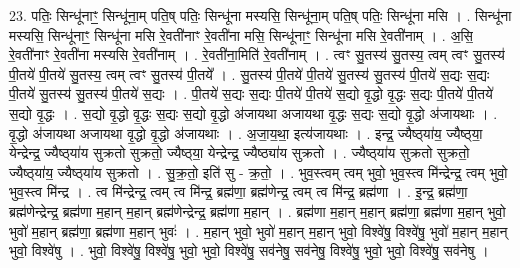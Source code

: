 \documentclass[17pt]{extarticle}
\begin{document}
23. पतिः॒ सिन्धू॑नाꣳ॒॒ सिन्धू॑ना॒म् पति॒ष् पतिः॒ सिन्धू॑ना मस्यसि॒ सिन्धू॑ना॒म् पति॒ष् पतिः॒ सिन्धू॑ना मसि । . सिन्धू॑ना मस्यसि॒ सिन्धू॑नाꣳ॒॒ सिन्धू॑ना मसि रे॒वती॑नाꣳ रे॒वती॑ना मसि॒ सिन्धू॑नाꣳ॒॒ सिन्धू॑ना मसि रे॒वती॑नाम् । . अ॒सि॒ रे॒वती॑नाꣳ रे॒वती॑ना मस्यसि रे॒वती॑नाम् । . रे॒वती॑ना॒मिति॑ रे॒वती॑नाम् । . त्वꣳ सु॒तस्य॑ सु॒तस्य॒ त्वम् त्वꣳ सु॒तस्य॑ पी॒तये॑ पी॒तये॑ सु॒तस्य॒ त्वम् त्वꣳ सु॒तस्य॑ पी॒तये᳚ । . सु॒तस्य॑ पी॒तये॑ पी॒तये॑ सु॒तस्य॑ सु॒तस्य॑ पी॒तये॑ स॒द्यः स॒द्यः पी॒तये॑ सु॒तस्य॑ सु॒तस्य॑ पी॒तये॑ स॒द्यः । . पी॒तये॑ स॒द्यः स॒द्यः पी॒तये॑ पी॒तये॑ स॒द्यो वृ॒द्धो वृ॒द्धः स॒द्यः पी॒तये॑ पी॒तये॑ स॒द्यो वृ॒द्धः । . स॒द्यो वृ॒द्धो वृ॒द्धः स॒द्यः स॒द्यो वृ॒द्धो अ॑जायथा अजायथा वृ॒द्धः स॒द्यः स॒द्यो वृ॒द्धो अ॑जायथाः । . वृ॒द्धो अ॑जायथा अजायथा वृ॒द्धो वृ॒द्धो अ॑जायथाः । . अ॒जा॒य॒था॒ इत्य॑जायथाः । . इन्द्र॒ ज्यैष्ठ्‍या॑य॒ ज्यैष्ठ्‍या॒ येन्द्रेन्द्र॒ ज्यैष्ठ्‍या॑य सुक्रतो सुक्रतो॒ ज्यैष्ठ्‍या॒ येन्द्रेन्द्र॒ ज्यैष्ठ्या॑य सुक्रतो । . ज्यैष्ठ्‍या॑य सुक्रतो सुक्रतो॒ ज्यैष्ठ्‍या॑य॒ ज्यैष्ठ्‍या॑य सुक्रतो । . सु॒क्र॒तो॒ इति॑ सु - क्र॒तो॒ । . भुव॒स्त्वम् त्वम् भुवो॒ भुव॒स्त्व मि॑न्द्रेन्द्र॒ त्वम् भुवो॒ भुव॒स्त्व मि॑न्द्र । . त्व मि॑न्द्रेन्द्र॒ त्वम् त्व मि॑न्द्र॒ ब्रह्म॑णा॒ ब्रह्म॑णेन्द्र॒ त्वम् त्व मि॑न्द्र॒ ब्रह्म॑णा । . इ॒न्द्र॒ ब्रह्म॑णा॒ ब्रह्म॑णेन्द्रेन्द्र॒ ब्रह्म॑णा म॒हान् म॒हान् ब्रह्म॑णेन्द्रेन्द्र॒ ब्रह्म॑णा म॒हान् । . ब्रह्म॑णा म॒हान् म॒हान् ब्रह्म॑णा॒ ब्रह्म॑णा म॒हान् भुवो॒ भुवो॑ म॒हान् ब्रह्म॑णा॒ ब्रह्म॑णा म॒हान् भुवः॑ । . म॒हान् भुवो॒ भुवो॑ म॒हान् म॒हान् भुवो॒ विश्वे॑षु॒ विश्वे॑षु॒ भुवो॑ म॒हान् म॒हान् भुवो॒ विश्वे॑षु । . भुवो॒ विश्वे॑षु॒ विश्वे॑षु॒ भुवो॒ भुवो॒ विश्वे॑षु॒ सव॑नेषु॒ सव॑नेषु॒ विश्वे॑षु॒ भुवो॒ भुवो॒ विश्वे॑षु॒ सव॑नेषु । \newline
\end{document}
